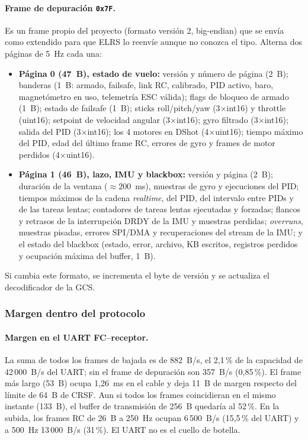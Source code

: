 \documentclass[12pt, letterpaper]{report}
\begin{document}
\paragraph{Frame de depuración \texttt{0x7F}.} Es un frame propio del proyecto (formato versión 2, big-endian) que se envía como extendido para que ELRS lo reenvíe aunque no conozca el tipo. Alterna dos páginas de 5~Hz cada una:
\begin{itemize}
    \item \textbf{Página 0 (47~B), estado de vuelo:} versión y número de página (2~B); banderas (1~B: armado, failsafe, link RC, calibrado, PID activo, baro, magnetómetro en uso, telemetría ESC válida); flags de bloqueo de armado (1~B); estado de failsafe (1~B); sticks roll/pitch/yaw (3$\times$int16) y throttle (uint16); setpoint de velocidad angular (3$\times$int16); gyro filtrado (3$\times$int16); salida del PID (3$\times$int16); los 4 motores en DShot (4$\times$uint16); tiempo máximo del PID, edad del último frame RC, errores de gyro y frames de motor perdidos (4$\times$uint16).
    \item \textbf{Página 1 (46~B), lazo, IMU y blackbox:} versión y página (2~B); duración de la ventana ($\approx 200$~ms), muestras de gyro y ejecuciones del PID; tiempos máximos de la cadena \textit{realtime}, del PID, del intervalo entre PIDs y de las tareas lentas; contadores de tareas lentas ejecutadas y forzadas; flancos y retrasos de la interrupción DRDY de la IMU y muestras perdidas; \textit{overruns}, muestras pisadas, errores SPI/DMA y recuperaciones del stream de la IMU; y el estado del blackbox (estado, error, archivo, KB escritos, registros perdidos y ocupación máxima del buffer, 1~B).
\end{itemize}
Si cambia este formato, se incrementa el byte de versión y se actualiza el decodificador de la GCS.

\subsubsection{Margen dentro del protocolo}
\paragraph{Margen en el UART FC--receptor.} La suma de todos los frames de bajada es de 882~B/s, el 2,1\,\% de la capacidad de 42\,000~B/s del UART; sin el frame de depuración son 357~B/s (0,85\,\%). El frame más largo (53~B) ocupa 1,26~ms en el cable y deja 11~B de margen respecto del límite de 64~B de CRSF. Aun si todos los frames coincidieran en el mismo instante (133~B), el buffer de transmisión de 256~B quedaría al 52\,\%. En la subida, los frames RC de 26~B a 250~Hz ocupan 6\,500~B/s (15,5\,\% del UART) y a 500~Hz 13\,000~B/s (31\,\%). El UART no es el cuello de botella.
\end{document}
